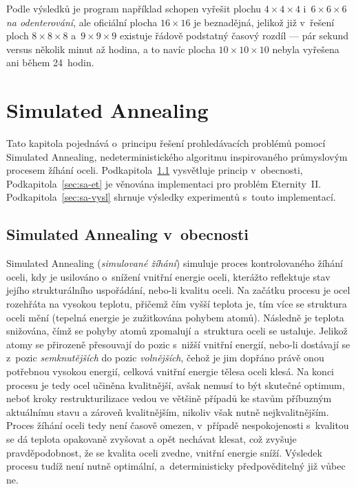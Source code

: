 \documentclass[11pt, titlepage]{report}
\begin{document}
Podle výsledků je program například schopen vyřešit plochu $4 \times 4 \times 4$ i~$6 \times 6 \times 6$ \emph{na odenterování}, ale oficiální plocha $16 \times 16$ je beznadějná, jelikož již v~řešení ploch $8 \times 8 \times 8$ a~$9 \times 9 \times 9$ existuje řádově podstatný časový rozdíl --- pár sekund versus několik minut až hodina, a to navíc plocha $10 \times 10 \times 10$ nebyla vyřešena ani během 24~hodin.


\chapter{Simulated Annealing}
\label{ch:sa}

Tato kapitola pojednává o~principu řešení prohledávacích problémů pomocí Simulated Annealing, nedeterministického algoritmu inspirovaného průmyslovým procesem žíhání oceli. Podkapitola~\ref{sec:sa-obecne} vysvětluje princip v~obecnosti, Podkapitola~\ref{sec:sa-et} je věnována implementaci pro problém Eternity~II. Podkapitola~\ref{sec:sa-vysl} shrnuje výsledky experimentů s~touto implementací.

\section{Simulated Annealing v~obecnosti}
\label{sec:sa-obecne}

Simulated Annealing (\emph{simulované žíhání}) simuluje proces kontrolovaného žíhání oceli, kdy je usilováno o~snížení vnitřní energie oceli, kterážto reflektuje stav jejího strukturálního uspořádání, nebo-li kvalitu oceli. Na začátku procesu je ocel rozehřáta na vysokou teplotu, přičemž čím vyšší teplota je, tím více se struktura oceli mění (tepelná energie je zužitkována pohybem atomů). Následně je teplota snižována, čímž se pohyby atomů zpomalují a~struktura oceli se ustaluje. Jelikož atomy se přirozeně přesouvají do pozic s~nižší vnitřní energií, nebo-li dostávají se z~pozic \emph{semknutějších} do pozic \emph{volnějších}, čehož je jim dopřáno právě onou potřebnou vysokou energií, celková vnitřní energie tělesa oceli klesá. Na konci procesu je tedy ocel učiněna kvalitnější, avšak nemusí to být skutečné optimum, neboť kroky restrukturilizace vedou ve většině případů ke stavům příbuzným aktuálnímu stavu a zároveň kvalitnějším, nikoliv však nutně nejkvalitnějším. Proces žíhání oceli tedy není časově omezen, v~případě nespokojenosti s~kvalitou se dá teplota opakovaně zvyšovat a opět nechávat klesat, což zvyšuje pravděpodobnost, že se kvalita oceli zvedne, vnitřní energie sníží. Výsledek procesu tudíž není nutně optimální, a~deterministicky předpověditelný již vůbec ne.
\end{document}
